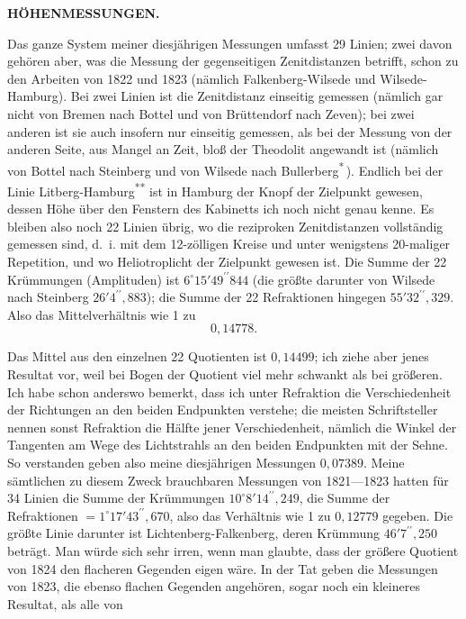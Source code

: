 \par\clearpage
\noindent\null\hfill{\small\textbf{HÖHENMESSUNGEN.}}\hfill{}\par\medskip
\par\noindent\hspace*{\parindent}Das ganze System meiner diesjährigen Messungen umfasst 29 Linien;
zwei davon gehören aber, was die Messung der gegenseitigen Zenitdistanzen
betrifft, schon zu den Arbeiten von 1822 und 1823 (nämlich Falkenberg-Wilsede
und Wilsede-Hamburg). Bei zwei Linien ist die Zenitdistanz  einseitig
gemessen (nämlich gar nicht von Bremen nach Bottel und von Brüttendorf
nach Zeven); bei zwei anderen ist sie auch insofern nur einseitig gemessen,
als bei der Messung von der anderen Seite, aus Mangel an Zeit, bloß der
Theodolit angewandt ist (nämlich von Bottel nach Steinberg und von Wilsede
nach Bullerberg\textsuperscript{*}\,). Endlich bei der Linie Litberg-Hamburg\textsuperscript{**} ist in Hamburg
der Knopf der Zielpunkt gewesen, dessen Höhe über den Fenstern des Kabinetts ich noch nicht genau kenne. Es bleiben also noch 22 Linien übrig, wo
die reziproken Zenitdistanzen vollständig gemessen sind, d.~i. mit dem 12-zölligen Kreise und unter wenigstens 20-maliger Repetition, und wo  Heliotroplicht der Zielpunkt gewesen ist. Die Summe der 22 Krümmungen (Amplituden) ist \(6^\circ15'49^{\prime\prime}844\) (die größte darunter von Wilsede nach
Steinberg \(26'4^{\prime\prime}{,}883\)); die Summe der 22 Refraktionen hingegen \(55'32^{\prime\prime}{,}329\).
Also das Mittelverhältnis wie 1 zu
\[0{,}14778.\]
\par\noindent\hspace*{\parindent}Das Mittel aus den einzelnen 22 Quotienten ist \(0{,}14499\); ich ziehe aber
jenes Resultat vor, weil bei  Bogen der Quotient viel mehr schwankt
als bei größeren. Ich habe schon anderswo bemerkt, dass ich unter Refraktion
die Verschiedenheit der Richtungen an den beiden Endpunkten verstehe; die
meisten Schriftsteller nennen sonst Refraktion die Hälfte jener Verschiedenheit,
nämlich die Winkel der Tangenten am Wege des Lichtstrahls an den beiden
Endpunkten mit der Sehne. So verstanden geben also meine diesjährigen
Messungen \(0{,}07389\). Meine sämtlichen zu diesem Zweck brauchbaren Messungen von 1821---1823 hatten für 34 Linien die Summe der Krümmungen
\(10^\circ8'14^{\prime\prime}{,}249\), die Summe der Refraktionen \(=1^\circ17'43^{\prime\prime}{,}670\), also das Verhältnis wie 1 zu \(0{,}12779\) gegeben. Die größte Linie darunter ist Lichtenberg-Falkenberg, deren Krümmung \(46'7^{\prime\prime}{,}250\) beträgt. Man würde sich sehr irren,
wenn man glaubte, dass der größere Quotient von 1824 den flacheren Gegenden eigen wäre. In der Tat geben die Messungen von 1823, die ebenso
flachen Gegenden angehören, sogar noch ein kleineres Resultat, als alle von
\par\medskip\noindent\hspace*{0.03\linewidth}{\footnotesize IX.}\hfill{}\par


